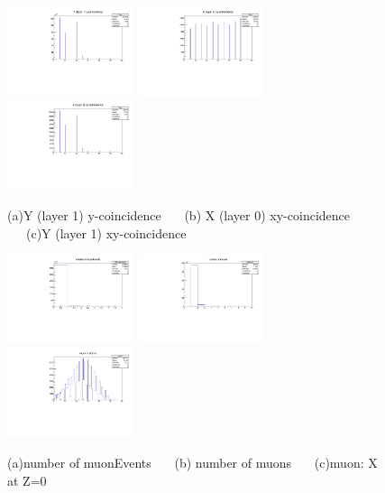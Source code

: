 \documentclass[a4paper,11pt]{article}
\theoremstyle{mytheor}
\begin{document}
\begin{figure}[H] 
\vspace*{-0.3cm} 
\includegraphics[width=0.33\textwidth,scale=0.5,trim=0 0 0 0,clip]{plotsdir/file0_test-Y1a-1.pdf} 
\includegraphics[width=0.33\textwidth,scale=0.5,trim=0 0 0 0,clip]{plotsdir/file0_test-X0b-1.pdf} 
\includegraphics[width=0.33\textwidth,scale=0.5,trim=0 0 0 0,clip]{plotsdir/file0_test-Y1b-1.pdf} 
\caption{(a)Y (layer 1) y-coincidence ~~~(b) X (layer 0) xy-coincidence ~~~(c)Y (layer 1) xy-coincidence } 
\end{figure} 
\begin{figure}[H] 
\vspace*{-0.3cm} 
\includegraphics[width=0.33\textwidth,scale=0.5,trim=0 0 0 0,clip]{plotsdir/file0_test-nMuonEvents-1.pdf} 
\includegraphics[width=0.33\textwidth,scale=0.5,trim=0 0 0 0,clip]{plotsdir/file0_test-nMuons-1.pdf} 
\includegraphics[width=0.33\textwidth,scale=0.5,trim=0 0 0 0,clip]{plotsdir/file0_test-muX-1.pdf} 
\caption{(a)number of muonEvents ~~~(b) number of muons ~~~(c)muon: X at Z=0 } 
\end{figure} 
\end{document}
